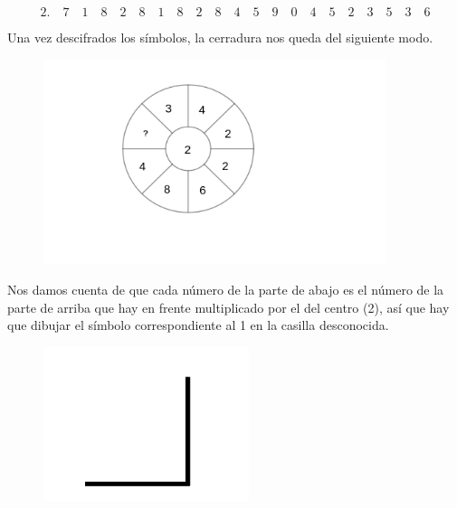 \documentclass[12pt,spanish]{article}
\begin{document}
\vspace{-10mm}
\[2.\quad 7\quad 1\quad 8\quad 2\quad 8\quad 1\quad 8\quad 2\quad 8\quad 4\quad 5\quad 9\quad 0\quad 4\quad 5\quad 2\quad 3\quad 5\quad 3\quad 6\]

Una vez descifrados los símbolos, la cerradura nos queda del siguiente modo.

\begin{figure}[H]
  \centering
  \includegraphics[width=100mm]{6_imagenes/cerradura-resuelta}
\end{figure}

Nos damos cuenta de que cada número de la parte de abajo es el número
de la parte de arriba que hay en frente multiplicado por el del centro
(2), así que hay que dibujar el símbolo correspondiente al 1 en la
casilla desconocida.

\begin{figure}[H]
  \centering
  \includegraphics[width=60mm]{6_imagenes/solucion}
\end{figure}
\end{document}
